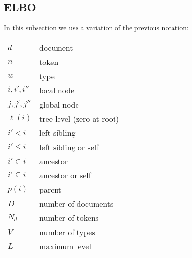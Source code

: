 \documentclass{article}
\newcommand{\leftsibling}{\ensuremath{<}}
\newcommand{\leftsiblingeq}{\ensuremath{\le}}
\newcommand{\ancestor}{\ensuremath{\subset}}
\newcommand{\ancestoreq}{\ensuremath{\subseteq}}
\newcommand{\parent}[1]{\ensuremath{p\left(#1\right)}}
\newcommand{\level}[1]{\ensuremath{\ell\left(#1\right)}}
\begin{document}
\subsection*{ELBO}

In this subsection we use a variation of the previous notation:

\begin{tabular}{ll}
    $d$ & document \\
    $n$ & token \\
    $w$ & type \\
    $i, i', i''$ & local node \\
    $j, j', j''$ & global node \\
    $\level{i}$ & tree level (zero at root) \\
    $i' \leftsibling i$ & left sibling \\
    $i' \leftsiblingeq i$ & left sibling or self \\
    $i' \ancestor i$ & ancestor \\
    $i' \ancestoreq i$ & ancestor or self \\
    $\parent{i}$ & parent \\
    $D$ & number of documents \\
    $N_d$ & number of tokens \\
    $V$ & number of types \\
    $L$ & maximum level \\
\end{tabular}
\end{document}
